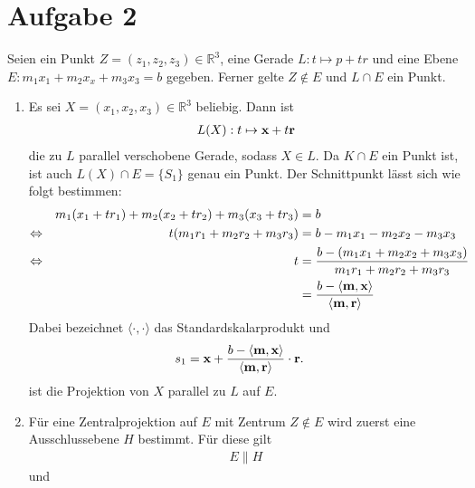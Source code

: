 \documentclass[11pt]{article}
\renewcommand{\vec}{\textbf}
\begin{document}
\section*{Aufgabe 2}
Seien ein Punkt $ Z = (z_1,z_2,z_3) \in \mathbb{R}^3 $, eine Gerade $ L:t\mapsto p+tr $ und eine Ebene $ E: m_1x_1 + m_2x_x + m_3x_3 = b $ gegeben. Ferner gelte $ Z \notin E $ und $ L \cap E $ ein Punkt.
\begin{enumerate}
	\item Es sei $ X = (x_1,x_2,x_3) \in \mathbb{R}^3 $ beliebig. Dann ist
	\begin{equation*}
	\begin{aligned}
	L(X): t \mapsto \vec x + t \vec r
	\end{aligned}
	\end{equation*}
	die zu $ L $ parallel verschobene Gerade, sodass $ X \in L $. Da $ K \cap E $ ein Punkt ist, ist auch $ L(X) \cap E = \lbrace S_1 \rbrace $ genau ein Punkt. Der Schnittpunkt lässt sich wie folgt bestimmen:
	\begin{equation*}
	\begin{aligned}
	&&m_1(x_1+tr_1) +m_2(x_2+tr_2) + m_3(x_3+tr_3) &= b\\
	\Leftrightarrow && t (m_1r_1+ m_2r_2 + m_3r_3) &= b - m_1x_1 - m_2x_2 - m_3x_3\\
	\Leftrightarrow && t &= \frac{b - (m_1x_1 + m_2x_2 + m_3x_3)}{m_1r_1 + m_2r_2 + m_3r_3}\\
	&& &= \frac{b - \langle \vec m, \vec x \rangle}{\langle \vec m, \vec r \rangle}
	\end{aligned}
	\end{equation*}
	Dabei bezeichnet $ \langle \cdot,\cdot \rangle $ das Standardskalarprodukt und
	\begin{equation*}
	\begin{aligned}
	s_1 &= \vec x + \frac{b - \langle \vec m, \vec x \rangle}{\langle \vec m,\vec r \rangle} \cdot \vec r.
	\end{aligned}
	\end{equation*}
	ist die Projektion von $ X $ parallel zu $ L $ auf $ E $.
	\item Für eine Zentralprojektion auf $ E $ mit Zentrum $ Z \notin E $ wird zuerst eine Ausschlussebene $ H $ bestimmt. Für diese gilt
	\begin{equation*}
	\begin{aligned}
	E \parallel H
	\end{aligned}
	\end{equation*}
	und
	\begin{equation*}

\end{equation*}
\end{enumerate}
\end{document}
